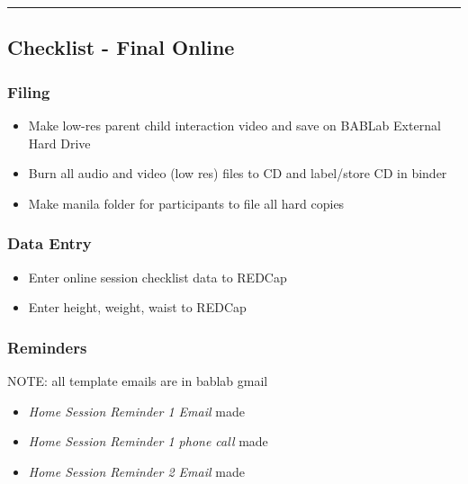 \documentclass[]{book}
\providecommand{\tightlist}{%
  \setlength{\itemsep}{0pt}\setlength{\parskip}{0pt}}
\begin{document}
\begin{center}\rule{0.5\linewidth}{0.5pt}\end{center}

\hypertarget{checklist---final-online}{%
\subsection{Checklist - Final Online}\label{checklist---final-online}}

\hypertarget{filing-3}{%
\subsubsection{Filing}\label{filing-3}}

\begin{itemize}
\tightlist
\item
  Make low-res parent child interaction video and save on BABLab External Hard Drive
\item
  Burn all audio and video (low res) files to CD and label/store CD in binder
\item
  Make manila folder for participants to file all hard copies
\end{itemize}

\hypertarget{data-entry-1}{%
\subsubsection{Data Entry}\label{data-entry-1}}

\begin{itemize}
\tightlist
\item
  Enter online session checklist data to REDCap
\item
  Enter height, weight, waist to REDCap
\end{itemize}

\hypertarget{reminders-2}{%
\subsubsection{Reminders}\label{reminders-2}}

NOTE: all template emails are in bablab gmail

\begin{itemize}
\tightlist
\item
  \emph{Home Session Reminder 1 Email} made
\item
  \emph{Home Session Reminder 1 phone call} made
\item
  \emph{Home Session Reminder 2 Email} made
\end{itemize}
\end{document}
